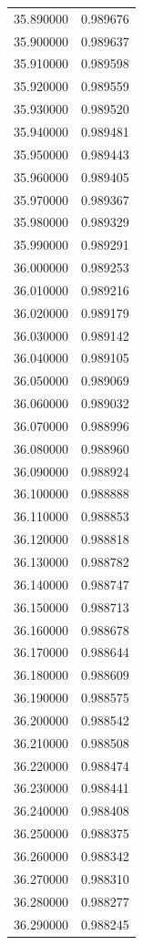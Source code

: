\begin{tabular}{rr}
35.890000 & 0.989676 \\
35.900000 & 0.989637 \\
35.910000 & 0.989598 \\
35.920000 & 0.989559 \\
35.930000 & 0.989520 \\
35.940000 & 0.989481 \\
35.950000 & 0.989443 \\
35.960000 & 0.989405 \\
35.970000 & 0.989367 \\
35.980000 & 0.989329 \\
35.990000 & 0.989291 \\
36.000000 & 0.989253 \\
36.010000 & 0.989216 \\
36.020000 & 0.989179 \\
36.030000 & 0.989142 \\
36.040000 & 0.989105 \\
36.050000 & 0.989069 \\
36.060000 & 0.989032 \\
36.070000 & 0.988996 \\
36.080000 & 0.988960 \\
36.090000 & 0.988924 \\
36.100000 & 0.988888 \\
36.110000 & 0.988853 \\
36.120000 & 0.988818 \\
36.130000 & 0.988782 \\
36.140000 & 0.988747 \\
36.150000 & 0.988713 \\
36.160000 & 0.988678 \\
36.170000 & 0.988644 \\
36.180000 & 0.988609 \\
36.190000 & 0.988575 \\
36.200000 & 0.988542 \\
36.210000 & 0.988508 \\
36.220000 & 0.988474 \\
36.230000 & 0.988441 \\
36.240000 & 0.988408 \\
36.250000 & 0.988375 \\
36.260000 & 0.988342 \\
36.270000 & 0.988310 \\
36.280000 & 0.988277 \\
36.290000 & 0.988245 \\

\end{tabular}

